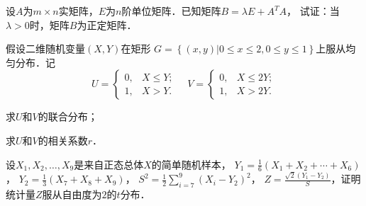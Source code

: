 \documentclass[plain,noanswer,medmath]{../../template/jnuexam}
\begin{document}



\begin{problem}
设$A$为$m \times n$实矩阵，$E$为$n$阶单位矩阵．已知矩阵$B = \lambda E + A^T A$，
试证：当$\lambda > 0$时，矩阵$B$为正定矩阵．
\end{problem}



\begin{problem}
假设二维随机变量$\left(X, Y \right)$在矩形
$G = \left\{\left. \left(x, y \right) \right|0 \le x \le 2, 0 \le y \le 1 \right\}$上服从均匀分布．记
$$U = \begin{cases}
  0, & X \le Y; \\
  1, & X > Y.
\end{cases}\quad V = \begin{cases}
  0, & X \le 2Y; \\
  1, & X > 2Y.
\end{cases}$$
\begin{enumerate*}
\item 求$U$和$V$的联合分布；
\item 求$U$和$V$的相关系数$r$．
\end{enumerate*}
\end{problem}



\begin{problem}
设$X_1,X_2, \ldots ,X_9$是来自正态总体$X$的简单随机样本，
$Y_1 = \frac{1}{6}\left(X_1 + X_2 + \cdots + X_6 \right)$，%
$Y_2 = \frac{1}{3}\left(X_7 + X_8 + X_9 \right)$，%
$S^2 = \frac{1}{2}\sum_{i = 7}^9 \left(X_i - Y_2 \right)^2$，%
$Z = \frac{\sqrt{2} \left(Y_1 - Y_2 \right)}{S}$，证明统计量$Z$服从自由度为$2$的$t$分布．
\end{problem}
\end{document}
